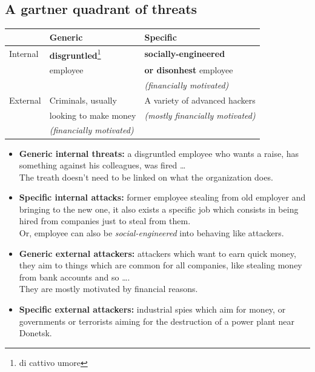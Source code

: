         \subsection{A gartner quadrant of threats}
            \begin{table}[ht!]
                \centering
                \begin{tabular}{|l|l|l|}
                    \hline
                            & Generic  & Specific  \\
                    \hline
                    Internal& \textbf{disgruntled}\footnote{di cattivo umore} &  \textbf{socially-engineered}\\
                            & employee & \textbf{or disonhest} employee\\
                            &          & \textit{(financially motivated)} \\
                    \hline
                    External& Criminals, usually & A variety of advanced hackers  \\
                            &  looking to make money & \textit{(mostly financially motivated)} \\
                            &  \textit{(financially motivated)} & \\
                    \hline
                \end{tabular}
            \end{table}
            \begin{itemize}
                \item \textbf{Generic internal threats:} a disgruntled employee who wants a raise, has something against his colleagues, was fired \dots\\
                                                The treath doesn't need to be linked on what the organization does. 
                \item \textbf{Specific internal attacks:} former employee stealing from old employer and bringing to the new one, it also exists a specific job which consists in being hired from companies just to steal from them.\\
                                                Or, employee can also be \textit{social-engineered} into behaving like attackers.
                \item \textbf{Generic external attackers:} attackers which want to earn quick money, they aim to things which are common for all companies, like stealing money from bank accounts and so \dots.\\
                                                They are mostly motivated by financial reasons.
                \item \textbf{Specific external attackers:} industrial spies which aim for money, or governments or terrorists aiming for the destruction of a power plant near Donetsk.
            \end{itemize}
